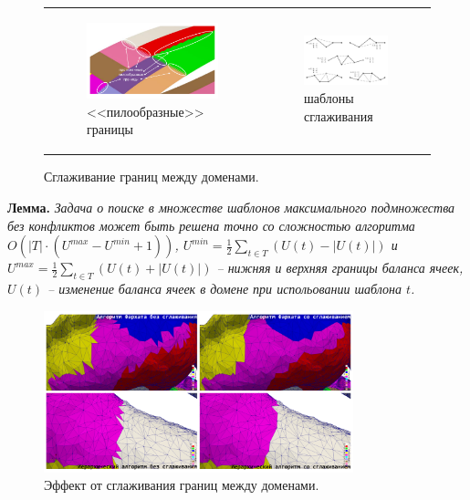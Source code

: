 \documentclass[a4paper,14pt]{extarticle}                     %
\theoremstyle{plain}                                         %
\begin{document}
\begin{figure}[ht]
\centering
\begin{tabular}{ll}
\begin{subfigure}{0.5\textwidth}\centering\includegraphics[width=0.75\columnwidth]{./pics/text_2_smooth/bad-border.pdf}\caption{<<пилообразные>> границы}\end{subfigure} &
\begin{subfigure}{0.5\textwidth}\centering\includegraphics[width=0.75\columnwidth]{./pics/text_2_smooth/smooth-border.pdf}\caption{шаблоны сглаживания}\end{subfigure}
\end{tabular}
\singlespacing
\caption{Сглаживание границ между доменами.}
\label{fig:par_smooth_borders}
\end{figure}

\textbf{Лемма.} \textit{Задача о поиске в множестве шаблонов максимального подмножества без конфликтов может быть решена точно со сложностью алгоритма $O \left( |T| \cdot (U^{max} - U^{min} + 1) \right)$, $U^{min} = \frac{1}{2} \sum_{t \in T}{(U(t) - |U(t)|)}$ и $U^{max} = \frac{1}{2} \sum_{t \in T}{(U(t) + |U(t)|)}$ -- нижняя и верхняя границы баланса ячеек, $U(t)$ -- изменение баланса ячеек в домене при испольовании шаблона $t$.}

\begin{figure}[!ht]
\centering
\includegraphics[width=0.8\textwidth]{./pics/text_2_smooth/decomp2.pdf}
\singlespacing
\caption{Эффект от сглаживания границ между доменами.}
\label{fig:text_2_smooth_decomp2}
\end{figure}
\end{document}
